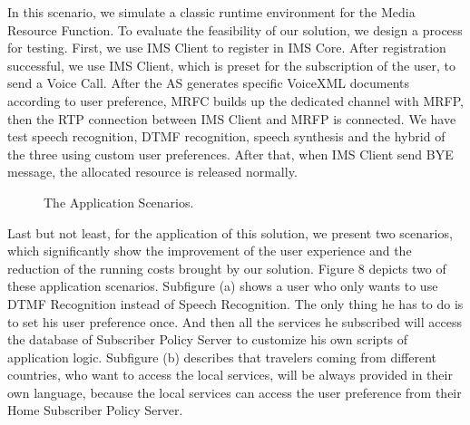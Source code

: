 \documentclass[10pt, conference, a4paper]{IEEEtran}
\begin{document}
In this scenario, we simulate a classic runtime environment for the Media Resource Function. To evaluate the feasibility of our solution, we design a process for testing. First, we use IMS Client to register in IMS Core. After registration successful, we use IMS Client, which is preset for the subscription of the user, to send a Voice Call. After the AS generates specific VoiceXML documents according to user preference, MRFC builds up the dedicated channel with MRFP, then the RTP connection between IMS Client and MRFP is connected. We have test speech recognition, DTMF recognition, speech synthesis and the hybrid of the three using custom user preferences. After that, when IMS Client send BYE message, the allocated resource is released normally. 

\begin{figure}[!t]
\centering
{}
\caption{The Application Scenarios.}
\end{figure}

Last but not least, for the application of this solution, we present two scenarios, which significantly show the improvement of the user experience and the reduction of the running costs brought by our solution. Figure 8 depicts two of these application scenarios. Subfigure (a) shows a user who only wants to use DTMF Recognition instead of Speech Recognition. The only thing he has to do is to set his user preference once. And then all the services he subscribed will access the database of Subscriber Policy Server to customize his own scripts of application logic. Subfigure (b) describes that travelers coming from different countries, who want to access the local services, will be always provided in their own language, because the local services can access the user preference from their Home Subscriber Policy Server.
\end{document}
